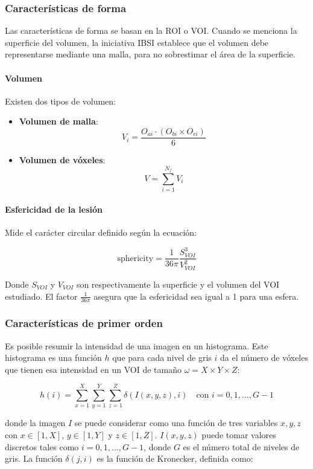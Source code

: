 \subsubsection{Características de forma}
Las características de forma se basan en la ROI o VOI. Cuando se menciona la superficie del volumen, la iniciativa IBSI establece que el volumen debe representarse mediante una malla, para no sobrestimar el área de la superficie.

\paragraph{Volumen}

Existen dos tipos de volumen:

\begin{itemize}
    \item \textbf{Volumen de malla}:
    \[
    V_i = \frac{O_{ai} \cdot (O_{bi} \times O_{ci})}{6}
    \]
    
    \item \textbf{Volumen de vóxeles}:
    \[
    V = \sum_{i=1}^{N_f} V_i \tag{2.11}
    \]
\end{itemize}

\paragraph{Esfericidad de la lesión}

Mide el carácter circular definido según la ecuación:

\[
\text{sphericity} = \frac{1}{36\pi} \frac{S_{VOI}^3}{V_{VOI}^2} \tag{2.12}
\]

Donde $S_{VOI}$ y $V_{VOI}$ son respectivamente la superficie y el volumen del VOI estudiado. El factor $\frac{1}{36\pi}$ asegura que la esfericidad sea igual a 1 para una esfera.

\subsubsection{Características de primer orden}
Es posible resumir la intensidad de una imagen en un histograma. Este histograma es una función $h$ que para cada nivel de gris $i$ da el número de vóxeles que tienen esa intensidad en un VOI de tamaño $\omega = X \times Y \times Z$:

\[
h(i) = \sum_{x=1}^{X} \sum_{y=1}^{Y} \sum_{z=1}^{Z} \delta(I(x, y, z), i) \quad \text{con } i = 0,1,\ldots,G-1 \tag{2.13}
\]

donde la imagen $I$ se puede considerar como una función de tres variables $x, y, z$ con $x \in [1,X]$, $y \in [1,Y]$ y $z \in [1,Z]$. $I(x,y,z)$ puede tomar valores discretos tales como $i = 0,1,\ldots,G-1$, donde $G$ es el número total de niveles de gris. La función $\delta(j,i)$ es la función de Kronecker, definida como:

